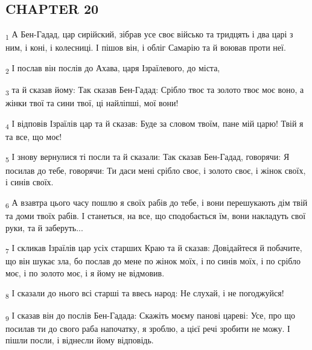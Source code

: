 \subsection{CHAPTER 20}
\begin{tcolorbox}
\textsubscript{1} А Бен-Гадад, цар сирійский, зібрав усе своє військо та тридцять і два царі з ним, і коні, і колесниці. І пішов він, і обліг Самарію та й воював проти неї.
\end{tcolorbox}
\begin{tcolorbox}
\textsubscript{2} І послав він послів до Ахава, царя Ізраїлевого, до міста,
\end{tcolorbox}
\begin{tcolorbox}
\textsubscript{3} та й сказав йому: Так сказав Бен-Гадад: Срібло твоє та золото твоє моє воно, а жінки твої та сини твої, ці найліпші, мої вони!
\end{tcolorbox}
\begin{tcolorbox}
\textsubscript{4} І відповів Ізраїлів цар та й сказав: Буде за словом твоїм, пане мій царю! Твій я та все, що моє!
\end{tcolorbox}
\begin{tcolorbox}
\textsubscript{5} І знову вернулися ті посли та й сказали: Так сказав Бен-Гадад, говорячи: Я посилав до тебе, говорячи: Ти даси мені срібло своє, і золото своє, і жінок своїх, і синів своїх.
\end{tcolorbox}
\begin{tcolorbox}
\textsubscript{6} А взавтра цього часу пошлю я своїх рабів до тебе, і вони перешукають дім твій та доми твоїх рабів. І станеться, на все, що сподобається їм, вони накладуть свої руки, та й заберуть...
\end{tcolorbox}
\begin{tcolorbox}
\textsubscript{7} І скликав Ізраїлів цар усіх старших Краю та й сказав: Довідайтеся й побачите, що він шукає зла, бо послав до мене по жінок моїх, і по синів моїх, і по срібло моє, і по золото моє, і я йому не відмовив.
\end{tcolorbox}
\begin{tcolorbox}
\textsubscript{8} І сказали до нього всі старші та ввесь народ: Не слухай, і не погоджуйся!
\end{tcolorbox}
\begin{tcolorbox}
\textsubscript{9} І сказав він до послів Бен-Гадада: Скажіть моєму панові цареві: Усе, про що посилав ти до свого раба напочатку, я зроблю, а цієї речі зробити не можу. І пішли посли, і віднесли йому відповідь.
\end{tcolorbox}
